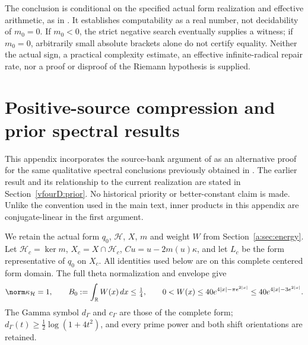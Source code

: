 \documentclass[11pt,a4paper]{article}
\numberwithin{equation}{section}
\theoremstyle{definition}\newtheorem{definition}[theorem]{Definition}
\theoremstyle{remark}\newtheorem{remark}[theorem]{Remark}
\newcommand{\R}{\mathbb R}\newcommand{\C}{\mathbb C}\newcommand{\N}{\mathbb N}
\newcommand{\Hh}{\mathcal H}\newcommand{\Hw}{\mathcal H}
\begin{document}
The conclusion is conditional on the specified actual form realization and
effective arithmetic, as in \cite{vfourComputable}.  It establishes
computability as a real number, not decidability of $m_0=0$.  If $m_0<0$, the
strict negative search eventually supplies a witness; if $m_0=0$, arbitrarily
small absolute brackets alone do not certify equality.  Neither the actual
sign, a practical complexity estimate, an effective infinite-radical repair
rate, nor a proof or disproof of the Riemann hypothesis is supplied.


\section{Positive-source compression and prior spectral results}\label{vfourD:section}
This appendix incorporates the source-bank argument of \cite{vfourSourceCompression} as an alternative proof for the same qualitative spectral conclusions previously obtained in \cite{vfourSchubr}. The earlier result and its relationship to the current realization are stated in Section~\ref{vfourD:prior}. No historical priority or better-constant claim is made. Unlike the convention used in the main text, inner products in this appendix are conjugate-linear in the first argument.

We retain the actual form $q_0$, $\Hh$, $X$, $m$ and weight $W$ from Section~\ref{a:sec:energy}. Let $\Hh_c=\ker m$, $X_c=X\cap\Hh_c$, $C u=u-2m(u)\kappa$, and let $L_c$ be the form representative of $q_0$ on $X_c$. All identities used below are on this complete centered form domain. The full theta normalization and envelope give
\begin{equation}\label{vfourD:Wbound}
 \norm\kappa_{\Hh}=1,\qquad B_0:=\int_\R W(x)\,dx\le\tfrac14,\qquad
 0<W(x)\le40e^{4|x|-\pi e^{2|x|}}\le40e^{4|x|-3e^{2|x|}}.
\end{equation}
The Gamma symbol $d_\Gamma$ and $c_\Gamma$ are those of the complete form; $d_\Gamma(t)\ge\frac12\log(1+4t^2)$, and every prime power and both shift orientations are retained.
\end{document}
